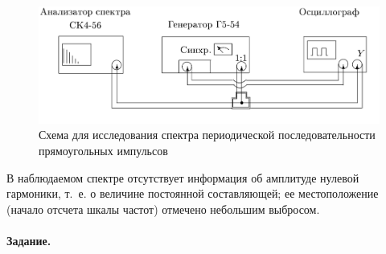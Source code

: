 \documentclass[a4paper, 12pt]{article}
\begin{document}
    \begin{figure}
        \includegraphics[scale=0.3]{pic2.png}
        \caption{Схема для исследования спектра периодической последовательности прямоугольных импульсов}
    \end{figure}

    В наблюдаемом спектре отсутствует информация об амплитуде нулевой гармоники, т.~е. о величине постоянной составляющей; ее местоположение (начало отсчета шкалы частот) отмечено небольшим выбросом.

    \paragraph*{Задание.}
    
\end{document}
